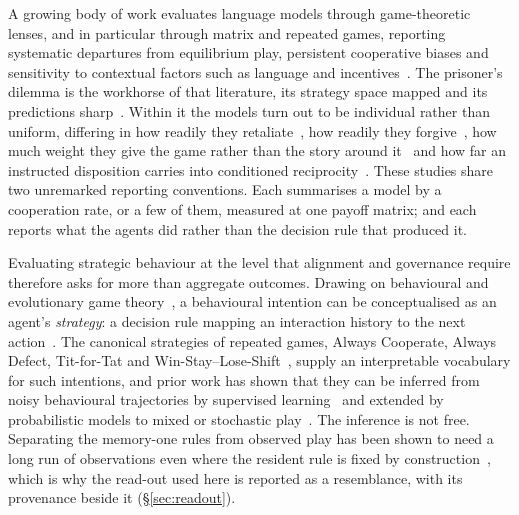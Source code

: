 \documentclass[openacc]{rsproca_new}
\begin{document}
A growing body of work evaluates language models through game-theoretic
lenses, and in particular through matrix and repeated games, reporting
systematic departures from equilibrium play, persistent cooperative biases and
sensitivity to contextual factors such as language and
incentives~\cite{buscemi2025fairgame,sun2025gtllm_survey,mao2025alympics,pal2026strategiescooperationdefectionlarge,willis2025will,fan2024can,pires2025large,fu2026optimal}.
The prisoner's dilemma is the workhorse of that literature, its strategy space
mapped and its predictions
sharp~\cite{axelrod1981evolution,axelrod1984evolution,nowak1992tit,nowak1993strategy,nowak2006five,pressDyson2012}.
Within it the models turn out to be individual rather than uniform, differing
in how readily they retaliate~\cite{akata2025}, how readily they
forgive~\cite{fontana2025nicer}, how much weight they give the game rather than
the story around it~\cite{loreheydari2024strategic} and how far an instructed
disposition carries into conditioned
reciprocity~\cite{phelps2023investigating}. These studies share two unremarked
reporting conventions. Each summarises a model by a cooperation rate, or a few
of them, measured at one payoff matrix; and each reports what the agents did
rather than the decision rule that produced it.

Evaluating strategic behaviour at the level that alignment and governance
require therefore asks for more than aggregate outcomes. Drawing on
behavioural and evolutionary game theory~\cite{sigmund:2010bo}, a behavioural
intention can be conceptualised as an agent's \emph{strategy}: a decision rule
mapping an interaction history to the next
action~\cite{han2011role,diStefanoIntention2023,Han2012ALIFEjournal,fujimoto2019functional}.
The canonical strategies of repeated games, Always Cooperate, Always Defect,
Tit-for-Tat and Win-Stay--Lose-Shift~\cite{Axelrod1980Effective,sigmund:2010bo},
supply an interpretable vocabulary for such intentions, and prior work has
shown that they can be inferred from noisy behavioural trajectories by
supervised learning~\cite{han2011role,diStefanoIntention2023} and extended by
probabilistic models to mixed or stochastic play~\cite{inferenceStrategies}.
The inference is not free. Separating the memory-one rules from observed play
has been shown to need a long run of observations even where the resident rule
is fixed by construction~\cite{kim2021win,hilbe2013memory}, which is why the
read-out used here is reported as a resemblance, with its provenance beside it
(\S\ref{sec:readout}).
\end{document}
